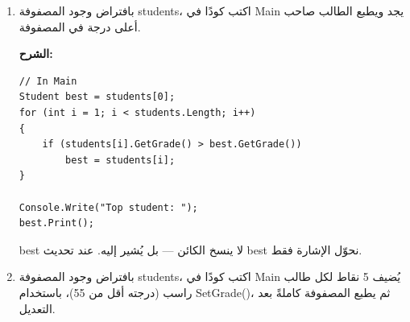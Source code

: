\documentclass[14pt]{extarticle}
\begin{document}
\begin{enumerate}
بافتراض وجود المصفوفة \textenglish{students} من السؤال السابق، اكتب كودًا في \textenglish{Main} يطبع:
\begin{itemize}
    \item عدد الطلاب الناجحين.
    \item عدد الطلاب الراسبين.
\end{itemize}

\ifwithsols
\textbf{الشرح:}
\begin{english}
\begin{verbatim}
// In Main
int passing = 0;
int failing = 0;

for (int i = 0; i < students.Length; i++)
{
    if (students[i].IsPassing())
        passing++;
    else
        failing++;
}

Console.WriteLine("Passing: " + passing);
Console.WriteLine("Failing: " + failing);
\end{verbatim}
\end{english}
\clearpage
\fi

\item %

بافتراض وجود المصفوفة \textenglish{students}، اكتب كودًا في \textenglish{Main} يجد ويطبع الطالب صاحب أعلى درجة في المصفوفة.

\ifwithsols
\textbf{الشرح:}
\begin{english}
\begin{verbatim}
// In Main
Student best = students[0];
for (int i = 1; i < students.Length; i++)
{
    if (students[i].GetGrade() > best.GetGrade())
        best = students[i];
}

Console.Write("Top student: ");
best.Print();
\end{verbatim}
\end{english}
\begin{boxNote}
\textenglish{best} لا ينسخ الكائن — بل يُشير إليه. عند تحديث \textenglish{best} نحوّل الإشارة فقط.
\end{boxNote}
\clearpage
\fi

\item %

بافتراض وجود المصفوفة \textenglish{students}، اكتب كودًا في \textenglish{Main} يُضيف 5 نقاط لكل طالب راسب (درجته أقل من 55)، باستخدام \textenglish{SetGrade()}، ثم يطبع المصفوفة كاملةً بعد التعديل.


\end{enumerate}
\end{document}
